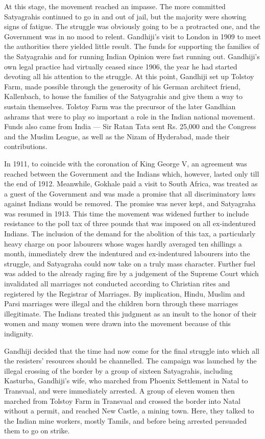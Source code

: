 \begin{multicols}{2}
At this stage, the movement reached an impasse. The more committed Satyagrahis continued to go in and out of jail, but the majority were showing signs of fatigue. The struggle was obviously going to be a protracted one, and the Government was in no mood to relent. Gandhiji's visit to London in 1909 to meet the authorities there yielded little result. The funds for supporting the families of the Satyagrahis and for running Indian Opinion were fast running out. Gandhiji's own legal practice had virtually ceased since 1906, the year he had started devoting all his attention to the struggle. At this point, Gandhiji set up Tolstoy Farm, made possible through the generosity of his German architect friend, Kallenbach, to house the families of the Satyagrahis and give them a way to sustain themselves. Tolstoy Farm was the precursor of the later Gandhian ashrams that were to play so important a role in the Indian national movement. Funds also came from India --- Sir Ratan Tata sent Rs. 25,000 and the Congress and the Muslim League, as well as the Nizam of Hyderabad, made their contributions.

In 1911, to coincide with the coronation of King George V, an agreement was reached between the Government and the Indians which, however, lasted only till the end of 1912. Meanwhile, Gokhale paid a visit to South Africa, was treated as a guest of the Government and was made a promise that all discriminatory laws against Indians would be removed. The promise was never kept, and Satyagraha was resumed in 1913. This time the movement was widened further to include resistance to the poll tax of three pounds that was imposed on all ex-indentured Indians. The inclusion of the demand for the abolition of this tax, a particularly heavy charge on poor labourers whose wages hardly averaged ten shillings a month, immediately drew the indentured and ex-indentured labourers into the struggle, and Satyagraha could now take on a truly mass character. Further fuel was added to the already raging fire by a judgement of the Supreme Court which invalidated all marriages not conducted according to Christian rites and registered by the Registrar of Marriages. By implication, Hindu, Muslim and Parsi marriages were illegal and the children born through these marriages illegitimate. The Indians treated this judgment as an insult to the honor of their women and many women were drawn into the movement because of this indignity.

Gandhiji decided that the time had now come for the final struggle into which all the resisters' resources should be channelled. The campaign was launched by the illegal crossing of the border by a group of sixteen Satyagrahis, including Kasturba, Gandhiji's wife, who marched from Phoenix Settlement in Natal to Transvaal, and were immediately arrested. A group of eleven women then marched from Tolstoy Farm in Transvaal and crossed the border into Natal without a permit, and reached New Castle, a mining town. Here, they talked to the Indian mine workers, mostly Tamils, and before being arrested persuaded them to go on strike.


\end{multicols}

